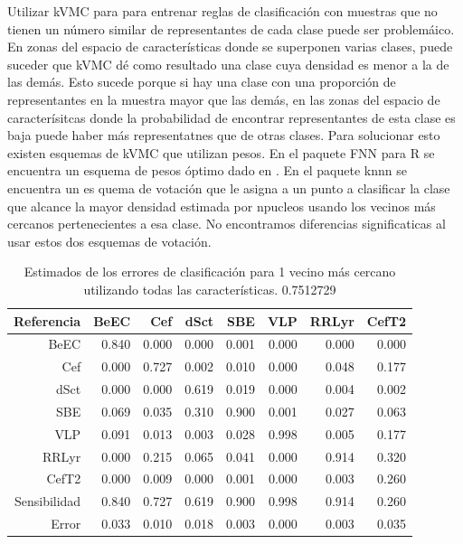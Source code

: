 \documentclass[letterpaper,12pt]{book}
\begin{document}
Utilizar kVMC para para entrenar reglas de clasificación con muestras que no tienen un número similar de representantes de cada clase puede ser problemáico. En zonas del espacio de características donde se superponen varias clases, puede suceder que kVMC dé como resultado una clase cuya densidad es menor a la de las demás. Esto sucede porque si hay una clase con una proporción de representantes en la muestra mayor que las demás, en las zonas del espacio de caracterísitcas donde la probabilidad de encontrar representantes de esta clase es baja puede haber más representatnes que de otras clases. Para solucionar esto existen esquemas de kVMC que utilizan pesos. En el paquete FNN para R se encuentra un esquema de pesos óptimo dado en . En el paquete knnn se encuentra un es quema de votación que le asigna a un punto a clasificar la clase que alcance la mayor densidad estimada por npucleos usando los vecinos más cercanos pertenecientes a esa clase. No encontramos diferencias significaticas al usar estos dos esquemas de votación. 

\begin{table}[ht]
  \centering
  \begin{tabular}{rrrrrrrr}
    \hline
    \hline
    Referencia& BeEC & Cef & dSct & SBE & VLP & RRLyr & CefT2 \\ 
    \hline
    \hline
    BeEC & 0.840 & 0.000 & 0.000 & 0.001 & 0.000 & 0.000 & 0.000 \\ 
    Cef & 0.000 & 0.727 & 0.002 & 0.010 & 0.000 & 0.048 & 0.177 \\ 
    dSct & 0.000 & 0.000 & 0.619 & 0.019 & 0.000 & 0.004 & 0.002 \\ 
    SBE & 0.069 & 0.035 & 0.310 & 0.900 & 0.001 & 0.027 & 0.063 \\ 
    VLP & 0.091 & 0.013 & 0.003 & 0.028 & 0.998 & 0.005 & 0.177 \\ 
    RRLyr & 0.000 & 0.215 & 0.065 & 0.041 & 0.000 & 0.914 & 0.320 \\ 
    CefT2 & 0.000 & 0.009 & 0.000 & 0.001 & 0.000 & 0.003 & 0.260 \\ 
    \hline
    \hline
    Sensibilidad & 0.840 & 0.727 & 0.619 & 0.900 & 0.998 & 0.914 & 0.260 \\
    \hline
    Error & 0.033 & 0.010 & 0.018 & 0.003 & 0.000 & 0.003 & 0.035 \\ 
    \hline
    \hline
  \end{tabular}
  \caption{Estimados de los errores de clasificación para 1 vecino más cercano utilizando todas las características. 0.7512729}
\end{table} 
\end{document}
